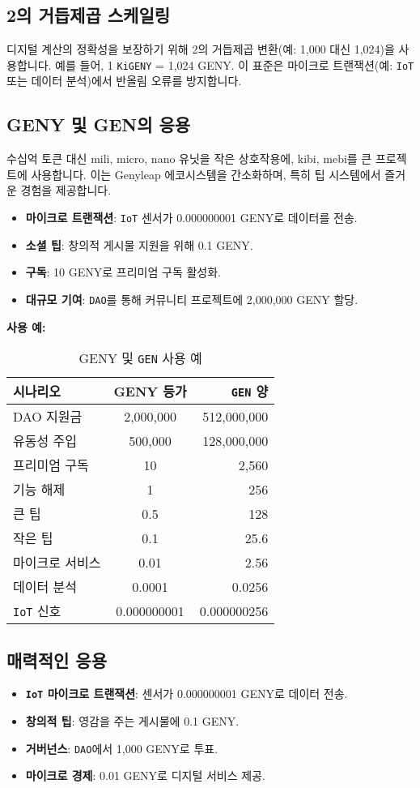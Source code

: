 \documentclass[a4paper,12pt,openany]{book}
\begin{document}
\subsection*{2의 거듭제곱 스케일링}
디지털 계산의 정확성을 보장하기 위해 2의 거듭제곱 변환(예: 1,000 대신 1,024)을 사용합니다. 예를 들어, 1 \texttt{KiGENY} = 1,024 GENY. 이 표준은 마이크로 트랜잭션(예: \texttt{IoT} 또는 데이터 분석)에서 반올림 오류를 방지합니다.

\subsection*{GENY 및 GEN의 응용}
수십억 토큰 대신 mili, micro, nano 유닛을 작은 상호작용에, kibi, mebi를 큰 프로젝트에 사용합니다. 이는 Genyleap 에코시스템을 간소화하며, 특히 팁 시스템에서 즐거운 경험을 제공합니다.
\begin{itemize}
    \item \textbf{마이크로 트랜잭션}: \texttt{IoT} 센서가 0.000000001 GENY로 데이터를 전송.
    \item \textbf{소셜 팁}: 창의적 게시물 지원을 위해 0.1 GENY.
    \item \textbf{구독}: 10 GENY로 프리미엄 구독 활성화.
    \item \textbf{대규모 기여}: \texttt{DAO}를 통해 커뮤니티 프로젝트에 2,000,000 GENY 할당.
\end{itemize}

\textbf{사용 예:}
\begin{table}[h]
\centering
\caption{GENY 및 \texttt{GEN} 사용 예}
\small
\begin{tabular}{l c r}
\hline
\textbf{시나리오} & \textbf{GENY 등가} & \textbf{\texttt{GEN} 양} \\
\hline
DAO 지원금 & 2,000,000 & 512,000,000 \\
유동성 주입 & 500,000 & 128,000,000 \\
프리미엄 구독 & 10 & 2,560 \\
기능 해제 & 1 & 256 \\
큰 팁 & 0.5 & 128 \\
작은 팁 & 0.1 & 25.6 \\
마이크로 서비스 & 0.01 & 2.56 \\
데이터 분석 & 0.0001 & 0.0256 \\
\texttt{IoT} 신호 & 0.000000001 & 0.000000256 \\
\hline
\end{tabular}
\end{table}

\subsection*{매력적인 응용}
\begin{itemize}
    \item \textbf{\texttt{IoT} 마이크로 트랜잭션}: 센서가 0.000000001 GENY로 데이터 전송.
    \item \textbf{창의적 팁}: 영감을 주는 게시물에 0.1 GENY.
    \item \textbf{거버넌스}: \texttt{DAO}에서 1,000 GENY로 투표.
    \item \textbf{마이크로 경제}: 0.01 GENY로 디지털 서비스 제공.
\end{itemize}
\end{document}
